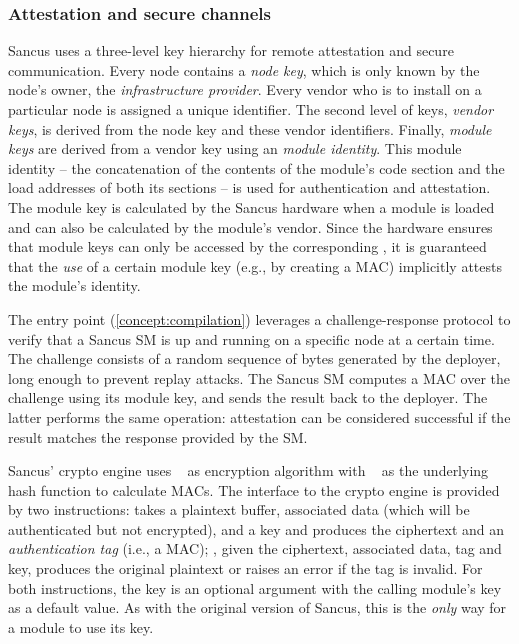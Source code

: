 \subsubsection{Attestation and secure channels}
% 
\label{impl:sancus-attestation}

Sancus uses a three-level key hierarchy for remote attestation and secure
communication.  Every node contains a \emph{node key}, which is only known by
the node's owner, the \emph{infrastructure provider}.  Every vendor who is to
install \protmods{} on a particular node is assigned a unique identifier.  The
second level of keys, \emph{vendor keys},  is derived from the node key and
these vendor identifiers.  Finally, \emph{module keys} are derived from a vendor
key using an \protmods{} \emph{module identity}.  This module identity -- the
concatenation of the contents of the module's code section and the load
addresses of both its sections -- is used for authentication and attestation.
The module key is calculated by the Sancus hardware when a module is loaded and
can also be calculated by the module's vendor.  Since the hardware ensures that
module keys can only be accessed by the corresponding \protmod, it is guaranteed
that the \emph{use} of a certain module key (e.g., by creating a \ac{MAC})
implicitly attests the module's identity.

The \attest{} entry point (\cref{concept:compilation}) leverages a
challenge-response protocol to verify that a Sancus \ac{SM} is up and running on
a specific node at a certain time. The challenge consists of a random sequence
of bytes generated by the deployer, long enough to prevent replay attacks. The
Sancus \ac{SM} computes a \ac{MAC} over the challenge using its module key, and
sends the result back to the deployer. The latter performs the same operation:
attestation can be considered successful if the result matches the response
provided by the \ac{SM}.

Sancus' crypto engine uses \spongewrap~\cite{duplex-sponge} as encryption
algorithm with \spongent~\cite{spongent} as the underlying hash function to
calculate \acp{MAC}. The interface to the crypto engine is provided by two
instructions: \wrap{} takes a plaintext buffer, associated data (which will be
authenticated but not encrypted), and a key and produces the ciphertext and an
\emph{authentication tag} (i.e., a \ac{MAC}); \unwrap{}, given the ciphertext,
associated data, tag and key, produces the original plaintext or raises an error
if the tag is invalid.  For both instructions, the key is an optional argument
with the calling module's key as a default value. As with the original version
of Sancus, this is the \emph{only} way for a module to use its key.

